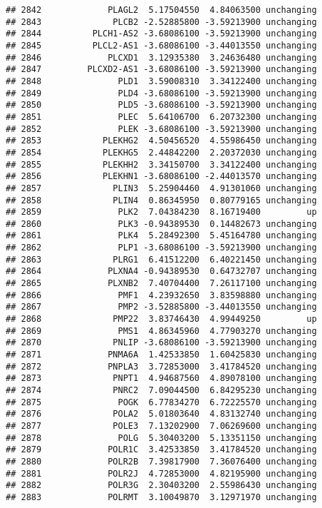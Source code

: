 \documentclass[]{article}
\begin{document}
\begin{verbatim}
## 2842             PLAGL2  5.17504550  4.84063500 unchanging
## 2843              PLCB2 -2.52885800 -3.59213900 unchanging
## 2844          PLCH1-AS2 -3.68086100 -3.59213900 unchanging
## 2845          PLCL2-AS1 -3.68086100 -3.44013550 unchanging
## 2846             PLCXD1  3.12935380  3.24636480 unchanging
## 2847         PLCXD2-AS1 -3.68086100 -3.59213900 unchanging
## 2848               PLD1  3.59008310  3.34122400 unchanging
## 2849               PLD4 -3.68086100 -3.59213900 unchanging
## 2850               PLD5 -3.68086100 -3.59213900 unchanging
## 2851               PLEC  5.64106700  6.20732300 unchanging
## 2852               PLEK -3.68086100 -3.59213900 unchanging
## 2853            PLEKHG2  4.50456520  4.55986450 unchanging
## 2854            PLEKHG5  2.44842200  2.20372030 unchanging
## 2855            PLEKHH2  3.34150700  3.34122400 unchanging
## 2856            PLEKHN1 -3.68086100 -2.44013570 unchanging
## 2857              PLIN3  5.25904460  4.91301060 unchanging
## 2858              PLIN4  0.86345950  0.80779165 unchanging
## 2859               PLK2  7.04384230  8.16719400         up
## 2860               PLK3 -0.94389530  0.14482673 unchanging
## 2861               PLK4  5.28492300  5.45164780 unchanging
## 2862               PLP1 -3.68086100 -3.59213900 unchanging
## 2863              PLRG1  6.41512200  6.40221450 unchanging
## 2864             PLXNA4 -0.94389530  0.64732707 unchanging
## 2865             PLXNB2  7.40704400  7.26117100 unchanging
## 2866               PMF1  4.23932650  3.83598880 unchanging
## 2867               PMP2 -3.52885800 -3.44013550 unchanging
## 2868              PMP22  3.83746430  4.99449250         up
## 2869               PMS1  4.86345960  4.77903270 unchanging
## 2870              PNLIP -3.68086100 -3.59213900 unchanging
## 2871             PNMA6A  1.42533850  1.60425830 unchanging
## 2872             PNPLA3  3.72853000  3.41784520 unchanging
## 2873              PNPT1  4.94687560  4.89078100 unchanging
## 2874              PNRC2  7.09044500  6.84295230 unchanging
## 2875               POGK  6.77834270  6.72225570 unchanging
## 2876              POLA2  5.01803640  4.83132740 unchanging
## 2877              POLE3  7.13202900  7.06269600 unchanging
## 2878               POLG  5.30403200  5.13351150 unchanging
## 2879             POLR1C  3.42533850  3.41784520 unchanging
## 2880             POLR2B  7.39817900  7.36076400 unchanging
## 2881             POLR2J  4.72853000  4.82195900 unchanging
## 2882             POLR3G  2.30403200  2.55986430 unchanging
## 2883             POLRMT  3.10049870  3.12971970 unchanging

\end{verbatim}
\end{document}
